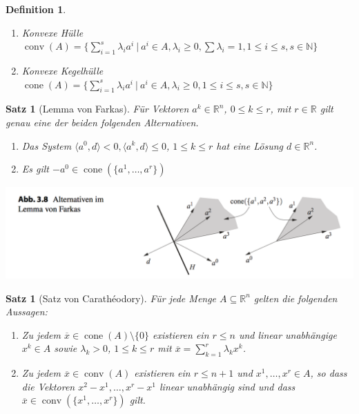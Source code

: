 \documentclass[11pt]{scrreprt}
\newcounter{thm}
\theoremstyle{thmstyle}
\numberwithin{thm}{section}
\newtheorem{satz}[thm]{Satz}
\newtheorem*{definition*}{Definition}
\begin{document}
\begin{definition*}
	\begin{enumerate}[label=\alph*\upshape)]
		\item Konvexe Hülle $\operatorname{conv}(A) = \big\{ \sum_{i=1}^s \lambda_i a^i ~|~ a^i \in A, \lambda_i \geq 0, \sum \lambda_i = 1, 1 \leq i \leq s, s \in \mathbb{N} \big\}$
		\item Konvexe Kegelhülle $\operatorname{cone}(A) = \big\{ \sum_{i=1}^s \lambda_i a^i ~|~ a^i \in A, \lambda_i \geq 0, 1 \leq i \leq s, s \in \mathbb{N} \big\}$
	\end{enumerate}	
\end{definition*}
 
\begin{satz}[Lemma von Farkas] 
	Für Vektoren $a^k \in \mathbb{R}^n$, $0 \leq k \leq r$, mit $r \in \mathbb{R}$ gilt genau eine der beiden folgenden Alternativen.
	\begin{enumerate}[label=\alph*\upshape)]
		\item Das System $\langle a^0, d \rangle < 0, \langle a^k, d \rangle \leq 0$, $1 \leq k \leq r$ hat eine Lösung $d \in \mathbb{R}^n$.
		\item Es gilt $-a^0 \in \operatorname{cone}(\{a^1, \dotsc, a^r \})$
	\end{enumerate}
\end{satz}

\begin{center}
	\includegraphics[scale=0.5]{img/ab38}
\end{center}
 
\begin{satz}[Satz von Carathéodory]
	Für jede Menge $A \subseteq \mathbb{R}^n$ gelten die folgenden Aussagen:
	\begin{enumerate}[label=\alph*\upshape)]
		\item Zu jedem $\overline{x} \in \operatorname{cone}(A) \setminus \{ 0 \}$ existieren ein $r \leq n$ und linear unabhängige $x^k \in A$ sowie $\lambda_k > 0$, $1 \leq k \leq r$ mit $\overline{x} = \sum_{k=1}^r \lambda_k x^k$.
		\item Zu jedem $\overline{x} \in \operatorname{conv}(A)$ existieren ein $r \leq n + 1$ und $x^1, \dotsc, x^r \in A$, so dass die Vektoren $x^2 - x^1, \dotsc, x^r - x^1$ linear unabhängig sind und dass $\overline{x} \in \operatorname{conv}(\{ x^1, \dotsc, x^r \})$ gilt.
	\end{enumerate}
\end{satz} 
 
\end{document}
